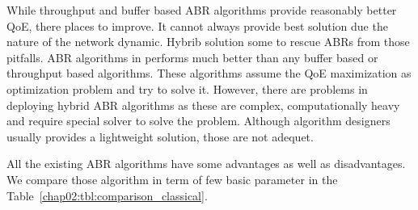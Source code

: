 While throughput and buffer based ABR algorithms provide reasonably better QoE, there places to improve. It cannot always provide best solution due the nature of the network dynamic. Hybrib solution some to rescue ABRs from those pitfalls. ABR algorithms in \cite{7247436,140405,yin2015control,10.1145/2670518.2673877} performs much better than any buffer based or throughput based algorithms. These algorithms assume the QoE maximization as optimization problem and try to solve it. However, there are problems in deploying hybrid ABR algorithms as these are complex, computationally heavy and require special solver to solve the problem. Although algorithm designers usually provides a lightweight solution, those are not adequet.

All the existing ABR algorithms have some advantages as well as disadvantages. We compare those algorithm in term of few basic parameter in the Table~\ref{chap02:tbl:comparison_classical}.

